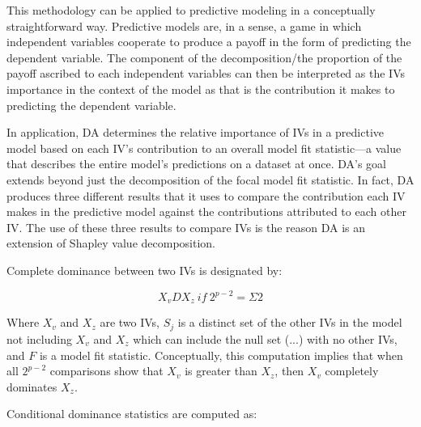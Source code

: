 \documentclass[ShortAfour,times,sageapa]{sagej}
\begin{document}
	This methodology can be applied to predictive modeling in a conceptually straightforward way.
	 Predictive models are, in a sense, a game in which independent variables cooperate to produce a payoff in the form of predicting the dependent variable. 
	The component of the decomposition/the proportion of the payoff ascribed to each independent variables can then be interpreted as the IVs importance in the context of the model as that is the contribution it makes to predicting the dependent variable.
	
	In application, DA determines the relative importance of IVs in a predictive model based on each IV’s contribution to an overall model fit statistic—a value that describes the entire model’s predictions on a dataset at once. 
	DA’s goal extends beyond just the decomposition of the focal model fit statistic. 
	In fact, DA produces three different results that it uses to compare the contribution each IV makes in the predictive model against the contributions attributed to each other IV. 
	The use of these three results to compare IVs is the reason DA is an extension of Shapley value decomposition.
	
	Complete dominance between two IVs is designated by:
	
	\begin{equation}
		X_{v}DX_{z}\ if\ 2^{p-2} = \Sigma{2} %
	\end{equation}
	
	Where $X_v$ and $X_z$ are two IVs, $S_j$ is a distinct set of the other IVs in the model not including $X_v$ and $X_z$ which can include the null set (...) with no other IVs, and $F$ is a model fit statistic. Conceptually, this computation implies that when all $2^{p-2}$ comparisons show that $X_v$ is greater than $X_z$, then $X_v$ completely dominates $X_z$.
	
	Conditional dominance statistics are computed as:
	
\end{document}
